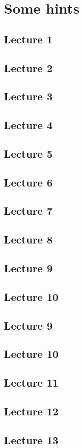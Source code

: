 \chapter{Some hints}

\section*{Lecture 1}
\section*{Lecture 2}
\section*{Lecture 3}
\section*{Lecture 4}
\section*{Lecture 5}
\section*{Lecture 6}
\section*{Lecture 7}
\section*{Lecture 8}
\section*{Lecture 9}
\section*{Lecture 10}
\section*{Lecture 9}
\section*{Lecture 10}
\section*{Lecture 11}
\section*{Lecture 12}
\section*{Lecture 13}
